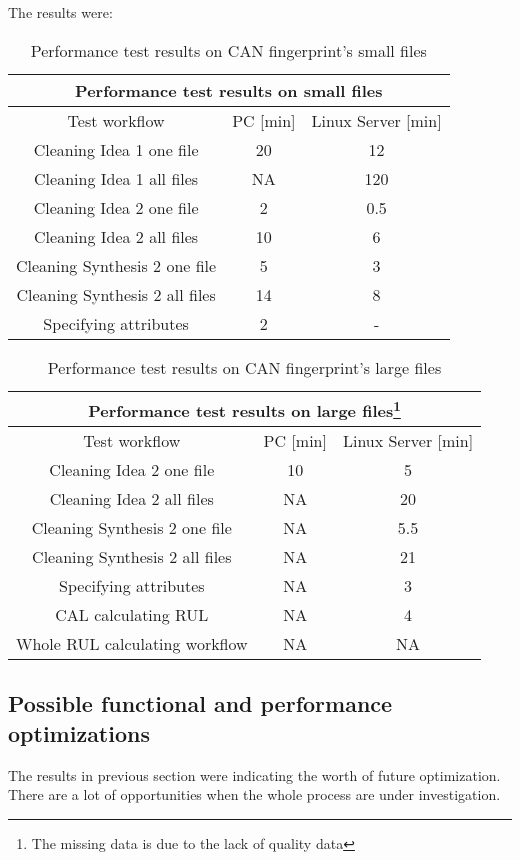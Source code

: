 The results were:
\begin{table}[H]
\centering
\begin{tabular}{ |c|c|c|  }
\hline
\multicolumn{3}{|c|}{Performance test results on small files} \\
\hline
Test workflow& PC [min] & Linux Server [min]\\
\hline
Cleaning Idea 1 one file& 20 & 12 \\
Cleaning Idea 1 all files& NA & 120 \\
Cleaning Idea 2 one file& 2 & 0.5 \\
Cleaning Idea 2 all files& 10 & 6 \\
Cleaning Synthesis 2 one file& 5 & 3 \\
Cleaning Synthesis 2 all files& 14 & 8 \\
Specifying attributes & 2 & - \\
\hline
\end{tabular}
\caption{Performance test results on CAN fingerprint's small files}
\label{table:1}
\end{table}

\begin{table}[H]
\centering
\begin{tabular}{ |c|c|c|  }
\hline
\multicolumn{3}{|c|}{Performance test results on large files\footnote{The missing data is due to the lack of quality data}} \\
\hline
Test workflow& PC [min] & Linux Server [min]\\
\hline
Cleaning Idea 2 one file& 10 & 5 \\
Cleaning Idea 2 all files& NA & 20 \\
Cleaning Synthesis 2 one file& NA & 5.5 \\
Cleaning Synthesis 2 all files& NA & 21 \\
Specifying attributes & NA & 3 \\
CAL calculating RUL & NA & 4 \\
Whole RUL calculating workflow & NA & NA \\
\hline
\end{tabular}
\caption{Performance test results on CAN fingerprint's large files}
\label{table:2}
\end{table}
\subsection{Possible functional and performance optimizations}
The results in previous section were indicating the worth of future optimization. There are a lot of opportunities when the whole process are under investigation.


